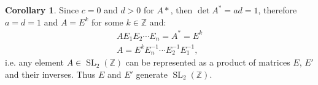 \documentclass{article}
\theoremstyle{definition}
\newtheorem*{corollary}{Corollary}
\newcommand{\Z}{\mathbb{Z}}
\newcommand{\SL}[2]{\operatorname{SL}_{#1}(#2)}
\begin{document}
\begin{corollary}
Since $c = 0$ and $d > 0$ for $A*$, then $\det A^* = ad = 1$, therefore $a=d=1$ and $A = E^k$ for some $k \in \Z$ and:
\begin{gather*}
    A E_1 E_2 \cdots E_n  = A^* = E^k \\
    A = E^k E_n^{-1} \cdots E_2^{-1} E_1^{-1},
\end{gather*}
i.e. any element $A \in \SL{2}{\Z}$ can be represented as a product of matrices $E$, $E'$ and their inverses. Thus $E$ and $E'$ generate $\SL{2}{\Z}$.
\end{corollary}
\end{document}
